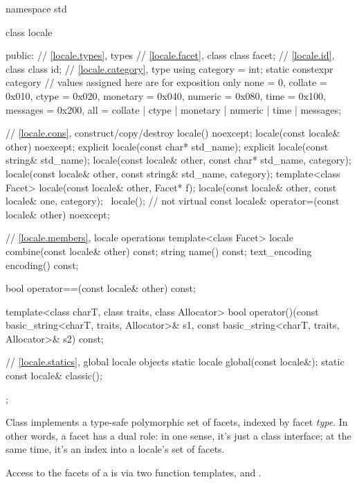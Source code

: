 \begin{codeblock}
namespace std {
  class locale {
  public:
    // \ref{locale.types}, types
    // \ref{locale.facet}, class 
    class facet;
    // \ref{locale.id}, class 
    class id;
    // \ref{locale.category}, type 
    using category = int;
    static constexpr category   // values assigned here are for exposition only
      none     = 0,
      collate  = 0x010, ctype    = 0x020,
      monetary = 0x040, numeric  = 0x080,
      time     = 0x100, messages = 0x200,
      all = collate | ctype | monetary | numeric | time  | messages;

    // \ref{locale.cons}, construct/copy/destroy
    locale() noexcept;
    locale(const locale& other) noexcept;
    explicit locale(const char* std_name);
    explicit locale(const string& std_name);
    locale(const locale& other, const char* std_name, category);
    locale(const locale& other, const string& std_name, category);
    template<class Facet> locale(const locale& other, Facet* f);
    locale(const locale& other, const locale& one, category);
    ~locale();                  // not virtual
    const locale& operator=(const locale& other) noexcept;

    // \ref{locale.members}, locale operations
    template<class Facet> locale combine(const locale& other) const;
    string name() const;
    text_encoding encoding() const;

    bool operator==(const locale& other) const;

    template<class charT, class traits, class Allocator>
      bool operator()(const basic_string<charT, traits, Allocator>& s1,
                      const basic_string<charT, traits, Allocator>& s2) const;

    // \ref{locale.statics}, global locale objects
    static       locale  global(const locale&);
    static const locale& classic();
  };
}
\end{codeblock}

\pnum
Class  implements a type-safe polymorphic set of facets,
indexed by facet \textit{type}.
In other words, a facet has a dual role:
in one sense, it's just a class interface;
at the same time, it's an index into a locale's set of facets.

\pnum
Access to the facets of a  is via two function templates,
 and .

